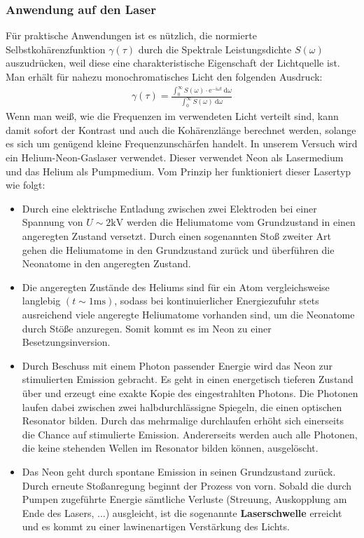 \documentclass[german,  %
parskip=full,  %
]{scrartcl}
\begin{document}
\subsubsection{Anwendung auf den Laser}
Für praktische Anwendungen ist es nützlich, die normierte Selbstkohärenzfunktion \(\gamma(\tau)\) durch die Spektrale Leistungsdichte \(S(\omega)\) auszudrücken, weil diese eine charakteristische Eigenschaft der Lichtquelle ist. Man erhält für nahezu monochromatisches Licht den folgenden Ausdruck:
\begin{align}
\gamma(\tau) = \frac{\int_{0}^{\infty} S(\omega)\cdot\mathrm{e}^{-\mathrm{i}\omega t}\ \mathrm{d}\omega}{\int_{0}^{\infty}S(\omega) \ \mathrm{d}\omega}
\end{align}
Wenn man weiß, wie die Frequenzen im verwendeten Licht verteilt sind, kann damit sofort der Kontrast und auch die Kohärenzlänge berechnet werden, solange es sich um genügend kleine Frequenzunschärfen handelt. In unserem Versuch wird ein Helium-Neon-Gaslaser verwendet. Dieser verwendet Neon als Lasermedium und das Helium als Pumpmedium. Vom Prinzip her funktioniert dieser Lasertyp wie folgt:
\begin{itemize}
\item Durch eine elektrische Entladung zwischen zwei Elektroden bei einer Spannung von \(U\sim 2\mathrm{kV}\) werden die Heliumatome vom Grundzustand in einen angeregten Zustand versetzt. Durch einen sogenannten Stoß zweiter Art gehen die Heliumatome in den Grundzustand zurück und überführen die Neonatome in den angeregten Zustand.
\item Die angeregten Zustände des Heliums sind für ein Atom vergleichsweise langlebig \((t\sim 1\mathrm{ms})\), sodass bei kontinuierlicher Energiezufuhr stets ausreichend viele angeregte Heliumatome vorhanden sind, um die Neonatome durch Stöße anzuregen. Somit kommt es im Neon zu einer Besetzungsinversion.
\item Durch Beschuss mit einem Photon passender Energie wird das Neon zur stimulierten Emission gebracht. Es geht in einen energetisch tieferen Zustand über und erzeugt eine exakte Kopie des eingestrahlten Photons. Die Photonen laufen dabei zwischen zwei halbdurchlässigne Spiegeln, die einen optischen Resonator bilden. Durch das mehrmalige durchlaufen erhöht sich einerseits die Chance auf stimulierte Emission. Andererseits werden auch alle Photonen, die keine stehenden Wellen im Resonator bilden können, ausgelöscht.
\item Das Neon geht durch spontane Emission in seinen Grundzustand zurück. Durch erneute Stoßanregung beginnt der Prozess von vorn. Sobald die durch Pumpen zugeführte Energie sämtliche Verluste (Streuung, Auskopplung am Ende des Lasers, ...) ausgleicht, ist die sogenannte \textbf{Laserschwelle} erreicht und es kommt zu einer lawinenartigen Verstärkung des Lichts.
\end{itemize}
\end{document}
